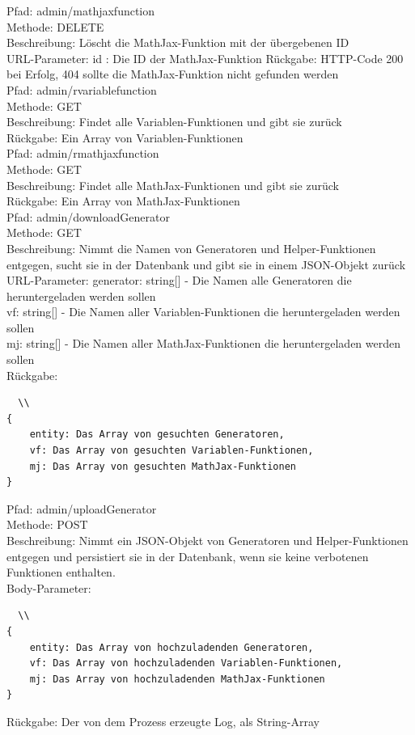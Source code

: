 \noindent Pfad: admin/mathjaxfunction \\
Methode: DELETE \\
Beschreibung: Löscht die MathJax-Funktion mit der übergebenen ID \\
URL-Parameter: id : Die ID der MathJax-Funktion
Rückgabe: HTTP-Code 200 bei Erfolg, 404 sollte die MathJax-Funktion nicht gefunden werden \\

\noindent Pfad: admin/rvariablefunction \\
Methode: GET \\
Beschreibung: Findet alle Variablen-Funktionen und gibt sie zurück \\
Rückgabe: Ein Array von Variablen-Funktionen \\

\noindent Pfad: admin/rmathjaxfunction \\
Methode: GET \\
Beschreibung: Findet alle MathJax-Funktionen und gibt sie zurück \\
Rückgabe: Ein Array von MathJax-Funktionen \\

\noindent Pfad: admin/downloadGenerator \\
Methode: GET \\
Beschreibung: Nimmt die Namen von Generatoren und Helper-Funktionen entgegen, sucht sie in der Datenbank und gibt sie in einem JSON-Objekt zurück \\
URL-Parameter: generator: string[] - Die Namen alle Generatoren die heruntergeladen werden sollen \\
vf: string[] - Die Namen aller Variablen-Funktionen die heruntergeladen werden sollen \\
mj: string[] - Die Namen aller MathJax-Funktionen die heruntergeladen werden sollen \\
Rückgabe: \begin{lstlisting}  \\
{
	entity: Das Array von gesuchten Generatoren,
	vf: Das Array von gesuchten Variablen-Funktionen,
	mj: Das Array von gesuchten MathJax-Funktionen
}
\end{lstlisting}

\noindent Pfad: admin/uploadGenerator \\
Methode: POST \\
Beschreibung: Nimmt ein JSON-Objekt von Generatoren und Helper-Funktionen entgegen und persistiert sie in der Datenbank, wenn sie keine verbotenen Funktionen enthalten. \\
Body-Parameter:\begin{lstlisting}  \\
{
	entity: Das Array von hochzuladenden Generatoren,
	vf: Das Array von hochzuladenden Variablen-Funktionen,
	mj: Das Array von hochzuladenden MathJax-Funktionen
}
\end{lstlisting}
Rückgabe: Der von dem Prozess erzeugte Log, als String-Array \\

